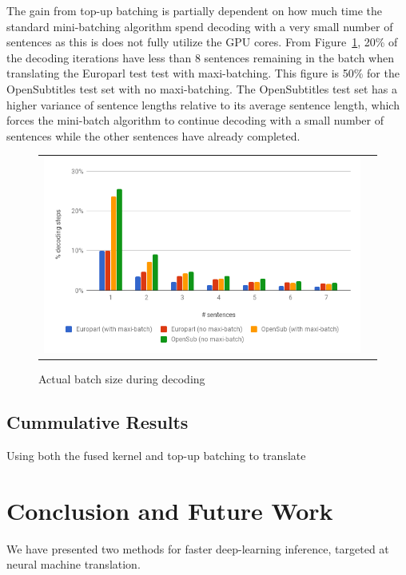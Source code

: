\documentclass[11pt,a4paper]{article}
\begin{document}
The gain from top-up batching is partially dependent on how much time the standard mini-batching algorithm spend decoding with a very small number of sentences as this is does not fully utilize the GPU cores. From Figure~\ref{fig:batch-size-small}, 20\% of the decoding iterations have less than 8 sentences remaining in the batch when translating the Europarl test test with maxi-batching. This figure is 50\% for the OpenSubtitles test set with no maxi-batching. The OpenSubtitles test set has a higher variance of sentence lengths relative to its average sentence length, which forces the mini-batch algorithm to continue decoding with a small number of sentences while the other sentences have already completed.

\begin{figure}
\centering
\begin{tabular}{cc}
{\includegraphics[scale=0.3]{batch-size-small.png}} 
\end{tabular}
\caption{Actual batch size during decoding}
\label{fig:batch-size-small}
\end{figure} 

\subsection{Cummulative Results}

Using both the fused kernel and top-up batching to translate 

\section{Conclusion and Future Work}

We have presented two methods for faster deep-learning inference, targeted at neural machine translation. 
\end{document}
